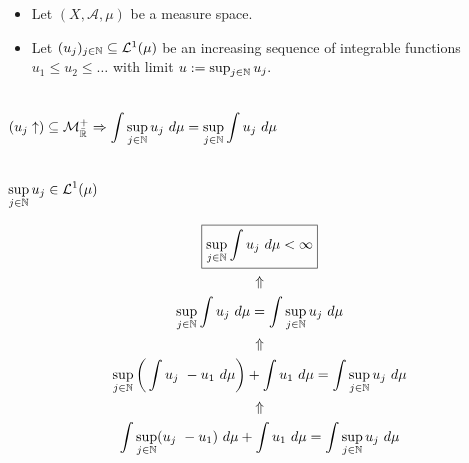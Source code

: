 \begin{minipage}[t]{0.45\textwidth}

\begin{given}
\begin{itemize}
\item  Let \((X,\mathcal{A},\mu )\) be a measure space.
\item  Let \((u_{j})_{j\in \Bbb{N}}\subseteq \mathcal{L}^1(\mu )\) be an increasing sequence of integrable functions \(u_{1}\leq u_{2}\leq \ldots \) with limit \(u:=\sup_{j\in \Bbb{N}}u_{j}.\)
\end{itemize}
\end{given}

\begin{tools}\\
\(\displaystyle
(u_{j}\uparrow )\subseteq \mathcal{M}_{\bar{\Bbb{R}}}^+\Rightarrow \int \sup_{j\in \Bbb{N}}u_{j}\  d\mu =\sup_{j\in \Bbb{N}}\int u_{j}\  d\mu 
\)
\end{tools}


\begin{assume} \\
\(\displaystyle \sup_{j\in \Bbb{N}} u_{j}\in \mathcal{L}^1(\mu) \)
\end{assume}


\end{minipage}
\begin{minipage}[t]{0.55\textwidth}
\vspace{-0.2in}
\begin{gather*}
\boxed{\sup_{j\in \Bbb{N}} \int  u_{j}\  d\mu  <\infty } \\
\Uparrow \\
\sup_{j\in \Bbb{N}} \int  u_{j}\  d\mu  =  \int \sup_{j\in \Bbb{N}} u_{j}\  d\mu   \\
\Uparrow  \\
\sup_{j\in \Bbb{N}}\bigg(\int  u_{j}\  - u_{1}\  d\mu \bigg) + \int  u_{1}\   d\mu  =  \int \sup_{j\in \Bbb{N}} u_{j}\  d\mu   \\
\Uparrow \\
\int \sup_{j\in \Bbb{N}} (u_{j}\  - u_{1})\  d\mu   + \int  u_{1}\   d\mu  = \int \sup_{j\in \Bbb{N}} u_{j}\  d\mu   \\
\end{gather*}
\end{minipage}

\noindent\makebox[\linewidth]{\rule{\paperwidth}{0.4pt}}

